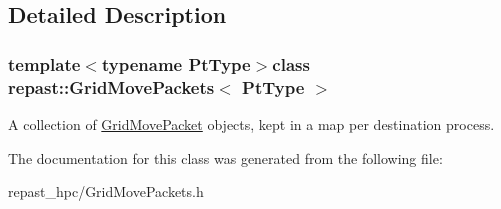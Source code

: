 \subsection{Detailed Description}
\subsubsection*{template$<$typename Pt\-Type$>$class repast\-::\-Grid\-Move\-Packets$<$ Pt\-Type $>$}

A collection of \hyperlink{structrepast_1_1_grid_move_packet}{Grid\-Move\-Packet} objects, kept in a map per destination process. 

The documentation for this class was generated from the following file\-:\begin{DoxyCompactItemize}
\item 
repast\-\_\-hpc/Grid\-Move\-Packets.\-h\end{DoxyCompactItemize}
